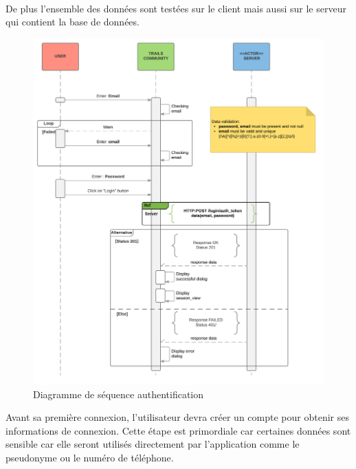 \documentclass[titlepage, 12pt]{report}
\begin{document}
\paragraph{}De plus l'ensemble des données sont testées sur le client mais aussi sur le serveur qui contient la base de données.


\begin{figure}[!h]
	\caption{Diagramme de séquence authentification}
	\label{authentification_sequence_diagram}
	\centering
	\includegraphics[scale=0.7]{Images/diagram/login_sequence_diagram.png}
\end{figure}

Avant sa première connexion, l'utilisateur devra créer un compte pour obtenir ses informations de connexion. Cette étape est primordiale car certaines données sont sensible car elle seront utilisés directement par l'application comme le pseudonyme ou le numéro de téléphone.

\end{document}
